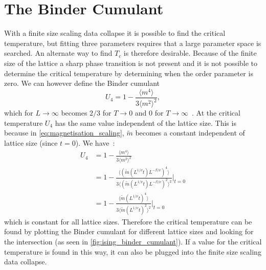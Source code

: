\documentclass[11pt, a4paper]{report} %
\begin{document}
\section{The Binder Cumulant}
With a finite size scaling data collapse it is possible to find the critical temperature, but fitting three parameters requires that a large parameter space is searched.
An alternate way to find \(T_c\) is therefore desirable.
Because of the finite size of the lattice a sharp phase transition is not present and it is not possible to determine the critical temperature by determining when the order parameter is zero.
We can however define the Binder cumulant~\cite{binder:1981b}
\begin{equation}
	U_4 = 1 - \frac{\langle m^4 \rangle}{3 \langle m^2 \rangle^2},
\end{equation}
which for \(L \to \infty\) becomes \(2/3\) for \(T \to 0\) and 0 for \(T \to \infty\)~\cite{landau:2015}.
At the critical temperature \(U_4\) has the same value independent of the lattice size.
This is because in \cref{eq:magnetisation_scaling}, \(\widetilde{m}\) becomes a constant independent of lattice size (since \(t=0\)).
We have~\cite{corboz}:
\begin{align}
	U_4 &= 1 - \frac{\langle m^4 \rangle}{3 \langle m^2 \rangle^2}\\
	&=1 - \frac{\langle \left(\widetilde{m}(L^{1/\nu}t) L^{-\beta/\nu}\right)^4 \rangle}{3 \langle \left(\widetilde{m}(L^{1/\nu}t) L^{-\beta/\nu}\right)^2 \rangle^2}\Bigg|_{t=0} \\
	&= 1 - \frac{\langle \widetilde{m}(L^{1/\nu}t) ^4 \rangle}{3 \langle \widetilde{m}(L^{1/\nu}t)^2 \rangle^2} \Bigg|_{t=0}
\end{align}
which is constant for all lattice sizes.
Therefore the critical temperature can be found by plotting the Binder cumulant for different lattice sizes and looking for the intersection (as seen in \cref{fig:ising_binder_cumulant}).
If a value for the critical temperature is found in this way, it can also be plugged into the finite size scaling data collapse.
\end{document}

